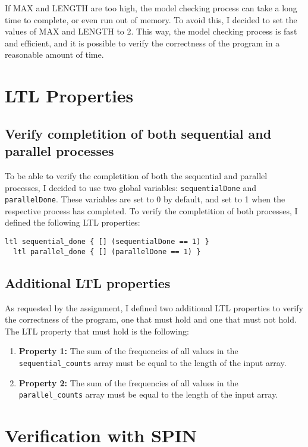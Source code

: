 \documentclass[a4paper, 11pt]{article}
\begin{document}
If MAX and LENGTH are too high, the model checking process can take a long time to complete, or even run out of memory. To avoid this, I decided to set the values of MAX and LENGTH to 2. This way, the model checking process is fast and efficient, and it is possible to verify the correctness of the program in a reasonable amount of time.

\pagebreak

\section{LTL Properties}
\label{sec:ltl_properties}

\subsection{Verify completition of both sequential and parallel processes}

To be able to verify the completition of both the sequential and parallel processes, I decided to use two global variables: \texttt{sequentialDone} and \texttt{parallelDone}. These variables are set to 0 by default, and set to 1 when the respective process has completed. To verify the completition of both processes, I defined the following LTL properties:

\begin{lstlisting}[language=Promela, caption={LTL properties to verify the completition of both sequential and parallel processes}, captionpos=b, breaklines=true, label={lst:ltl_properties}]
  ltl sequential_done { [] (sequentialDone == 1) }
  ltl parallel_done { [] (parallelDone == 1) }
\end{lstlisting}

\subsection{Additional LTL properties}

As requested by the assignment, I defined two additional LTL properties to verify the correctness of the program, one that must hold and one that must not hold. The LTL property that must hold is the following:

\begin{enumerate}
	\item \textbf{Property 1:} The sum of the frequencies of all values in the \texttt{sequential\_counts} array must be equal to the length of the input array.
	\item \textbf{Property 2:} The sum of the frequencies of all values in the \texttt{parallel\_counts} array must be equal to the length of the input array.
\end{enumerate}


\pagebreak

\section{Verification with SPIN}

% 
\end{document}
